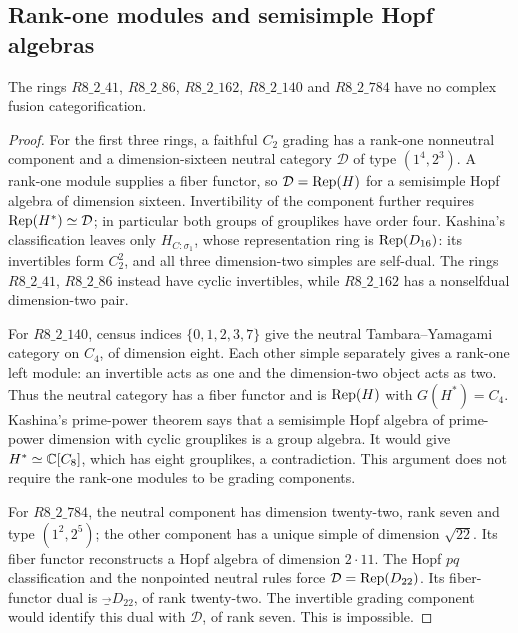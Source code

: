 \subsection{Rank-one modules and semisimple Hopf algebras}
\begin{proposition}\label{prop:hopf-small}
The rings $R8\_2\_41$, $R8\_2\_86$, $R8\_2\_162$, $R8\_2\_140$ and
$R8\_2\_784$ have no complex fusion categorification.
\end{proposition}
\begin{proof}
For the first three rings, a faithful $C_2$ grading has a rank-one
nonneutral component and a dimension-sixteen neutral category
$\mathcal D$ of type $(1^4,2^3)$. A rank-one module supplies a fiber
functor, so $\mathcal D=\operatorname{Rep}(H)$ for a semisimple Hopf algebra of
 dimension sixteen. Invertibility of the component further requires
$\operatorname{Rep}(H^*)\simeq\mathcal D$; in particular both groups of grouplikes
have order four. Kashina's classification
\cite[Theorem~1.2 and Table~1]{Kashina} leaves only $H_{C:\sigma_1}$,
whose representation ring is $\operatorname{Rep}(D_{16})$: its invertibles form
$C_2^2$, and all three dimension-two simples are self-dual.
The rings $R8\_2\_41$, $R8\_2\_86$ instead have cyclic invertibles,
while $R8\_2\_162$ has a nonselfdual dimension-two pair.

For $R8\_2\_140$, census indices $\{0,1,2,3,7\}$ give the neutral
Tambara--Yamagami category on $C_4$, of dimension eight. Each other
simple separately gives a rank-one left module: an invertible acts as
one and the dimension-two object acts as two. Thus the neutral category
has a fiber functor and is $\operatorname{Rep}(H)$ with $G(H^*)=C_4$.
Kashina's prime-power theorem \cite[Theorem~1.1]{Kashina} says that a
semisimple Hopf algebra of prime-power dimension with cyclic grouplikes
is a group algebra. It would give $H^*\simeq\mathbb C[C_8]$, which has eight
grouplikes, a contradiction. This argument does not require the
rank-one modules to be grading components.

For $R8\_2\_784$, the neutral component has dimension twenty-two,
rank seven and type $(1^2,2^5)$; the other component has a unique
simple of dimension $\sqrt{22}$. Its fiber functor reconstructs a
Hopf algebra of dimension $2\cdot11$. The Hopf $pq$ classification
\cite{HopfPQ} and the nonpointed neutral rules force
$\mathcal D=\operatorname{Rep}(D_{22})$. Its fiber-functor dual is
$\Vec_{D_{22}}$, of rank twenty-two. The invertible grading component
would identify this dual with $\mathcal D$, of rank seven. This is
impossible.
\end{proof}

